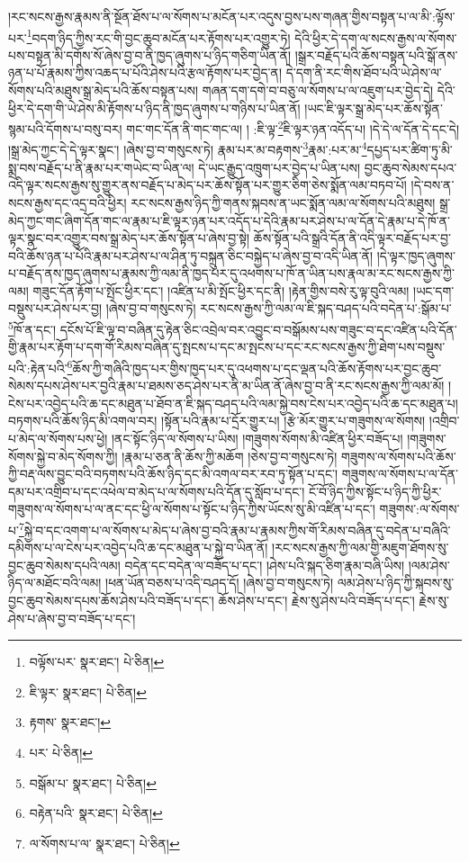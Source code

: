 །རང་སངས་རྒྱས་རྣམས་ནི་སྔོན་ཐོས་པ་ལ་སོགས་པ་མངོན་པར་འདུས་བྱས་པས་གཞན་གྱིས་བསྟན་པ་ལ་མི་:ལྟོས་པར་\footnote{བལྟོས་པར་  སྣར་ཐང་།  པེ་ཅིན། }བདག་ཉིད་ཀྱིས་རང་གི་བྱང་ཆུབ་མངོན་པར་རྟོགས་པར་འགྱུར་ཏེ། དེའི་ཕྱིར་དེ་དག་ལ་སངས་རྒྱས་ལ་སོགས་པས་བསྟན་མི་དགོས་སོ་ཞེས་བྱ་བ་ནི་ཁྱད་ཞུགས་པ་ཉིད་གཅིག་ཡིན་ནོ། །སྒྲར་བརྗོད་པའི་ཆོས་བསྟན་པའི་སྒོ་ནས་ཉན་པ་པོ་རྣམས་ཀྱིས་འཆད་པ་པོའི་ཤེས་པའི་རྩལ་རྟོགས་པར་བྱེད་ན། དེ་དག་ནི་རང་གིས་ཐོབ་པའི་ཡེ་ཤེས་ལ་སོགས་པའི་མཐུས་སྒྲ་མེད་པའི་ཆོས་བསྟན་པས། གཞན་དག་དགེ་བ་བཅུ་ལ་སོགས་པ་ལ་འཇུག་པར་བྱེད་དེ། དེའི་ཕྱིར་དེ་དག་གི་ཡེ་ཤེས་མི་རྟོགས་པ་ཉིད་ནི་ཁྱད་ཞུགས་པ་གཉིས་པ་ཡིན་ནོ། །ཡང་ཇི་ལྟར་སྒྲ་མེད་པར་ཆོས་སྟོན་སྙམ་པའི་དོགས་པ་བསུ་བར། གང་གང་དོན་ནི་གང་གང་ལ། །
:ཇི་ལྟ་\footnote{ཇི་ལྟར་  སྣར་ཐང་།  པེ་ཅིན། }ཇི་ལྟར་ཉན་འདོད་པ། །དེ་དེ་ལ་དོན་དེ་དང་དེ། །སྒྲ་མེད་ཀྱང་དེ་དེ་ལྟར་སྣང་། །ཞེས་བྱ་བ་གསུངས་ཏེ། རྣམ་པར་མ་བརྟགས་\footnote{རྟགས་  སྣར་ཐང་། }རྣམ་:པར་མ་\footnote{པར་  པེ་ཅིན། }དཔྱད་པར་ཚིག་ཏུ་མི་སྨྲ་བས་བརྗོད་པ་ནི་རྣམ་པར་གཡེང་བ་ཡིན་ལ། དེ་ཡང་རྒྱུད་འཁྲུག་པར་བྱེད་པ་ཡིན་པས། བྱང་ཆུབ་སེམས་དཔའ་འདི་ལྟར་སངས་རྒྱས་སུ་གྱུར་ནས་བརྗོད་པ་མེད་པར་ཆོས་སྟོན་པར་གྱུར་ཅིག་ཅེས་སྨོན་ལམ་བཏབ་པོ། །དེ་བས་ན་སངས་རྒྱས་དང་འདྲ་བའི་ཕྱིར། རང་སངས་རྒྱས་ཉིད་ཀྱི་གནས་སྐབས་ན་ཡང་སྨོན་ལམ་ལ་སོགས་པའི་མཐུས། སྒྲ་མེད་ཀྱང་གང་ཞིག་དོན་གང་ལ་རྣམ་པ་ཇི་ལྟར་ཉན་པར་འདོད་པ་དེའི་རྣམ་པར་ཤེས་པ་ལ་དོན་དེ་རྣམ་པ་དེ་ཁོ་ན་ལྟར་སྣང་བར་འགྱུར་བས་སྒྲ་མེད་པར་ཆོས་སྟོན་པ་ཞེས་བྱ་སྟེ། ཆོས་སྟོན་པའི་སྒྲའི་དོན་ནི་འདི་ལྟར་བརྗོད་པར་བྱ་བའི་ཆོས་ཉན་པ་པོའི་རྣམ་པར་ཤེས་པ་ལ་ཤིན་ཏུ་བསྐྲུན་ཅིང་བསྐྱེད་པ་ཞེས་བྱ་བ་འདི་ཡིན་ནོ། །དེ་ལྟར་ཁྱད་ཞུགས་པ་བརྗོད་ནས་ཁྱད་ཞུགས་པ་རྣམས་ཀྱི་ལམ་ནི་ཁྱད་པར་དུ་འཕགས་པ་ཁོ་ན་ཡིན་པས་རྣལ་མ་རང་སངས་རྒྱས་ཀྱི་ལམ། གཟུང་དོན་རྟོག་པ་སྤོང་ཕྱིར་དང་། །འཛིན་པ་མི་སྤོང་ཕྱིར་དང་ནི། །རྟེན་གྱིས་བསེ་རུ་ལྟ་བུའི་ལམ། །ཡང་དག་བསྡུས་པར་ཤེས་པར་བྱ། །ཞེས་བྱ་བ་གསུངས་ཏེ། རང་སངས་རྒྱས་ཀྱི་ལམ་ལ་ཇི་སྐད་བཤད་པའི་བདེན་པ་:སྒོམ་པ་\footnote{བསྒོམ་པ་  སྣར་ཐང་།  པེ་ཅིན། }ཁོ་ན་དང་། དངོས་པོ་ཇི་ལྟ་བ་བཞིན་དུ་རྟེན་ཅིང་འབྲེལ་བར་འབྱུང་བ་བསྒོམས་པས་གཟུང་བ་དང་འཛིན་པའི་དོན་གྱི་རྣམ་པར་རྟོག་པ་དག་གོ་རིམས་བཞིན་དུ་སྤངས་པ་དང་མ་སྤངས་པ་དང་རང་སངས་རྒྱས་ཀྱི་ཐེག་པས་བསྡུས་པའི་:རྟེན་པའི་\footnote{བརྟེན་པའི་  སྣར་ཐང་།  པེ་ཅིན། }ཆོས་ཀྱི་གཞིའི་ཁྱད་པར་གྱིས་ཁྱད་པར་དུ་འཕགས་པ་དང་ལྡན་པའི་ཆོས་རྟོགས་པར་བྱང་ཆུབ་སེམས་དཔས་ཤེས་པར་བྱའི་རྣམ་པ་ཐམས་ཅད་ཤེས་པར་ནི་མ་ཡིན་ནོ་ཞེས་བྱ་བ་ནི་རང་སངས་རྒྱས་ཀྱི་ལམ་མོ། །ངེས་པར་འབྱེད་པའི་ཆ་དང་མཐུན་པ་ཐོབ་ན་ཇི་སྐད་བཤད་པའི་ལམ་སྐྱེ་བས་ངེས་པར་འབྱེད་པའི་ཆ་དང་མཐུན་པ། བཏགས་པའི་ཆོས་ཉིད་མི་འགལ་བར། །སྟོན་པའི་རྣམ་པ་དྲོར་གྱུར་པ། །རྩེ་མོར་གྱུར་པ་གཟུགས་ལ་སོགས། །འགྲིབ་པ་མེད་ལ་སོགས་པས་ཕྱེ། །ནང་སྟོང་ཉིད་ལ་སོགས་པ་ཡིས། །གཟུགས་སོགས་མི་འཛིན་ཕྱིར་བཟོད་པ། །གཟུགས་སོགས་སྐྱེ་བ་མེད་སོགས་ཀྱི། །རྣམ་པ་ཅན་ནི་ཆོས་ཀྱི་མཆོག །ཅེས་བྱ་བ་གསུངས་ཏེ། གཟུགས་ལ་སོགས་པའི་ཆོས་ཀྱི་བརྡ་ལས་བྱུང་བའི་བཏགས་པའི་ཆོས་ཉིད་དང་མི་འགལ་བར་རབ་ཏུ་སྟོན་པ་དང་། གཟུགས་ལ་སོགས་པ་ལ་དོན་དམ་པར་འགྲིབ་པ་དང་འཕེལ་བ་མེད་པ་ལ་སོགས་པའི་དོན་དུ་སློབ་པ་དང་། ངོ་བོ་ཉིད་ཀྱིས་སྟོང་པ་ཉིད་ཀྱི་ཕྱིར་གཟུགས་ལ་སོགས་པ་ལ་ནང་དང་ཕྱི་ལ་སོགས་པ་སྟོང་པ་ཉིད་ཀྱིས་ཡོངས་སུ་མི་འཛིན་པ་དང་། གཟུགས་:ལ་སོགས་པ་\footnote{ལ་སོགས་པ་ལ་  སྣར་ཐང་།  པེ་ཅིན། }སྐྱེ་བ་དང་འགག་པ་ལ་སོགས་པ་མེད་པ་ཞེས་བྱ་བའི་རྣམ་པ་རྣམས་ཀྱིས་གོ་རིམས་བཞིན་དུ་བདེན་པ་བཞིའི་དམིགས་པ་ལ་ངེས་པར་འབྱེད་པའི་ཆ་དང་མཐུན་པ་སྐྱེ་བ་ཡིན་ནོ། །རང་སངས་རྒྱས་ཀྱི་ལམ་གྱི་མཇུག་ཐོགས་སུ་བྱང་ཆུབ་སེམས་དཔའི་ལམ། བདེན་དང་བདེན་ལ་བཟོད་པ་དང་། །ཤེས་པའི་སྐད་ཅིག་རྣམ་བཞི་ཡིས། །ལམ་ཤེས་ཉིད་ལ་མཐོང་བའི་ལམ། །ཕན་ཡོན་བཅས་པ་འདི་བཤད་དོ། །ཞེས་བྱ་བ་གསུངས་ཏེ། ལམ་ཤེས་པ་ཉིད་ཀྱི་སྐབས་སུ་བྱང་ཆུབ་སེམས་དཔས་ཆོས་ཤེས་པའི་བཟོད་པ་དང་། ཆོས་ཤེས་པ་དང་། རྗེས་སུ་ཤེས་པའི་བཟོད་པ་དང་། རྗེས་སུ་ཤེས་པ་ཞེས་བྱ་བ་བཟོད་པ་དང་། 